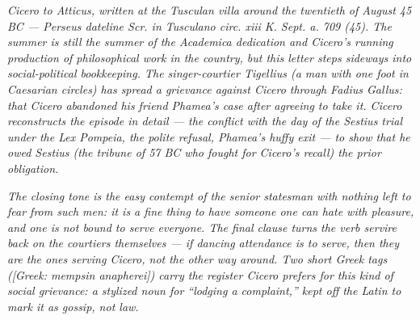 
\textit{Cicero to Atticus, written at the Tusculan villa around the
twentieth of August 45 BC --- Perseus dateline \textit{Scr. in
Tusculano circ. xiii K. Sept. a. 709 (45)}. The summer is still
the summer of the \textit{Academica} dedication and Cicero's
running production of philosophical work in the country, but
this letter steps sideways into social-political bookkeeping. The
singer-courtier Tigellius (a man with one foot in Caesarian
circles) has spread a grievance against Cicero through Fadius
Gallus: that Cicero abandoned his friend Phamea's case after
agreeing to take it. Cicero reconstructs the episode in detail
--- the conflict with the day of the Sestius trial under the Lex
Pompeia, the polite refusal, Phamea's huffy exit --- to show that
he owed Sestius (the tribune of 57 BC who fought for Cicero's
recall) the prior obligation.}

\textit{The closing tone is the easy contempt of the senior
statesman with nothing left to fear from such men: it is a fine
thing to have someone one can hate with pleasure, and one is not
bound to serve everyone. The final clause turns the verb
\textit{servire} back on the courtiers themselves --- if dancing
attendance is to serve, then they are the ones serving Cicero,
not the other way around. Two short Greek tags
(\textit{[Greek: mempsin anapherei]}) carry the register Cicero
prefers for this kind of social grievance: a stylized noun for
``lodging a complaint,'' kept off the Latin to mark it as gossip,
not law.}

